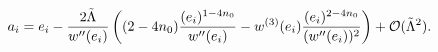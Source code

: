 \begin{equation}
a_{i}=e_{i}-\frac{2\tilde{\Lambda}}{w^{\prime \prime }(e_{i})}\left(
(2-4n_{0})\frac{(e_{i})^{1-4n_{0}}}{w^{\prime \prime }(e_{i})}-w^{(3)}(e_{i})%
\frac{(e_{i})^{2-4n_{0}}}{(w^{\prime \prime }(e_{i}))^{2}}\right) +{\cal O}(%
\tilde{\Lambda}^{2}).
\end{equation}

